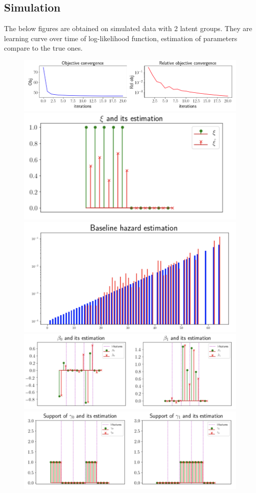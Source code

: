 \documentclass[11pt]{article}
\begin{document}
\subsection{Simulation}
The below figures are obtained on simulated data with 2 latent groups. They are  learning curve over time of log-likelihood function, estimation of parameters compare to the true ones.
\begin{figure}[!ht]
\centering
\includegraphics[width=.85\textwidth]{./figures/obj_vcg}
\includegraphics[width=.37\textwidth]{./figures/xi_estimation}
\includegraphics[width=.35\textwidth]{./figures/baseline_estimation}
\includegraphics[width=.8\textwidth]{./figures/beta_estimation}
\includegraphics[width=.8\textwidth]{./figures/gamma_estimation}
\end{figure}

\footnotesize

{}
\end{document}
